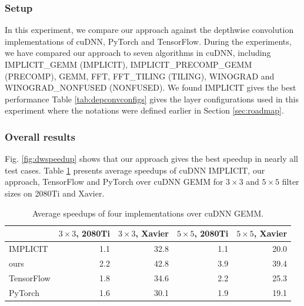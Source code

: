 \subsubsection{Setup} In this experiment, we compare our approach against the depthwise convolution implementations of cuDNN, PyTorch and TensorFlow.
During the experiments, we have compared our approach to seven algorithms in cuDNN, including IMPLICIT\_GEMM (IMPLICIT), IMPLICIT\_PRECOMP\_GEMM (PRECOMP), GEMM, FFT, FFT\_TILING (TILING), WINOGRAD and WINOGRAD\_NONFUSED (NONFUSED). We found IMPLICIT gives the best performance  Table \ref{tab:depconvconfigs} gives the layer configurations used in this experiment where the notations were defined earlier in Section \ref{sec:roadmap}.


\subsubsection{Overall results}
 Fig. \ref{fig:dwspeedup} shows that our approach gives the best speedup in nearly all test cases. Table \ref{tab:dwspeedups} presents average speedups of cuDNN IMPLICIT, our approach, TensorFlow and PyTorch over cuDNN GEMM for $3 \times 3$ and $5 \times 5$ filter sizes on 2080Ti and Xavier.
 
\begin{table}[]
\setlength{\tabcolsep}{2.3pt}
\caption{Average speedups of four implementations over cuDNN GEMM.}
\vspace{-3mm}
\label{tab:dwspeedups}
\centering
{}
\begin{threeparttable}
\begin{tabular}{l|r|r|r|r}
\toprule
& $3 \times 3$, 2080Ti & $3 \times 3$, Xavier &$5 \times 5$, 2080Ti&$5 \times 5$, Xavier\\
\midrule
IMPLICIT & 1.1 & 32.8 & 1.1 & 20.0\\
ours & 2.2 & 42.8 & 3.9 &39.4 \\
TensorFlow & 1.8 & 34.6 & 2.2 & 25.3\\
PyTorch & 1.6 & 30.1 & 1.9 & 19.1 \\

\bottomrule
\end{tabular}
\end{threeparttable}
\end{table}

